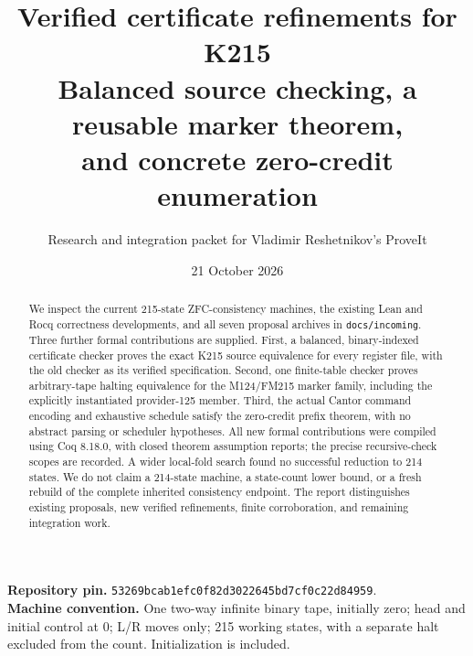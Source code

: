 \documentclass[11pt]{article}
\title{\textbf{Verified certificate refinements for K215}\\[8pt]
\large Balanced source checking, a reusable marker theorem,\\
and concrete zero-credit enumeration}
\author{Research and integration packet for Vladimir Reshetnikov's ProveIt}
\date{21 October 2026}
\theoremstyle{definition}\newtheorem{definition}[theorem]{Definition}
\newcommand{\code}[1]{\texttt{#1}}
\begin{document}
\maketitle
\begin{abstract}
We inspect the current 215-state ZFC-consistency machines, the existing Lean
and Rocq correctness developments, and all seven proposal archives in
\code{docs/incoming}. Three further formal contributions are supplied.
First, a balanced, binary-indexed certificate checker proves the exact K215
source equivalence for every register file, with the old checker as its
verified specification. Second, one finite-table checker proves arbitrary-tape
halting equivalence for the M124/FM215 marker family, including the explicitly
instantiated provider-125 member. Third, the actual Cantor command encoding
and exhaustive schedule satisfy the zero-credit prefix theorem, with no
abstract parsing or scheduler hypotheses. All new formal contributions were
compiled using Coq 8.18.0, with closed theorem assumption reports; the precise
recursive-check scopes are recorded. A wider local-fold search found no
successful reduction to 214 states. We do not claim a 214-state machine, a
state-count lower bound, or a fresh rebuild of the complete inherited
consistency endpoint. The report distinguishes existing proposals, new
verified refinements, finite corroboration, and remaining integration work.
\end{abstract}
\noindent\textbf{Repository pin.}
\code{53269bcab1efc0f82d3022645bd7cf0c22d84959}.\\
\textbf{Machine convention.} One two-way infinite binary tape, initially zero;
head and initial control at 0; L/R moves only; 215 working states, with a
separate halt excluded from the count. Initialization is included.
\newpage
\tableofcontents
\newpage







\end{document}
